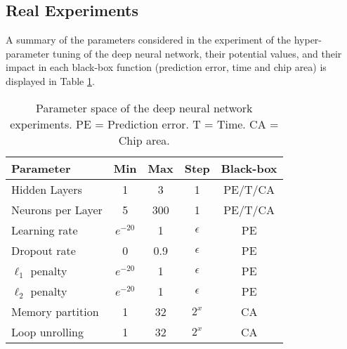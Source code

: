 \subsection{Real Experiments}

A summary of the parameters considered in the experiment of the hyper-parameter tuning of the deep neural network, their potential values, and their impact in each
black-box function (prediction error, time and chip area) is displayed in Table \ref{table:aladdin}.

\begin{table}[htb]
\centering
\caption{Parameter space of the deep neural network experiments. PE = Prediction error. T = Time. CA = Chip area.}
\begin{tabular}{lcccc}
 \hline
\textbf{Parameter} & \textbf{Min} & \textbf{Max} & \textbf{Step} & \textbf{Black-box} \\
 \hline
Hidden Layers & 1& 3& 1& PE/T/CA\\
Neurons per Layer & 5& 300& 1& PE/T/CA\\
Learning rate & $e^{-20}$& 1& $\epsilon$ & PE\\
Dropout rate & 0& 0.9& $\epsilon$ & PE\\
$\ell_1$ penalty & $e^{-20}$& 1& $\epsilon$ & PE\\
$\ell_2$ penalty & $e^{-20}$& 1& $\epsilon$ & PE\\
\hline
Memory partition & 1& 32& $2^{x}$& CA\\
Loop unrolling & 1& 32& $2^{x}$& CA\\
\hline
\end{tabular}
\label{table:aladdin}
\end{table}
